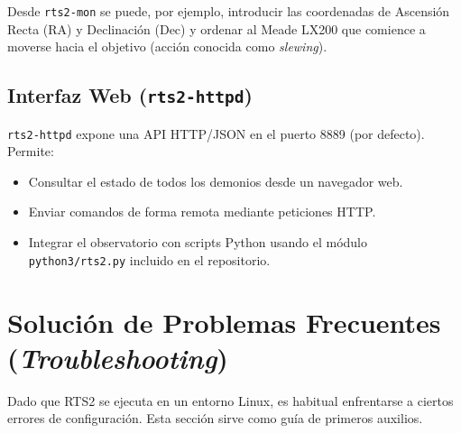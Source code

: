 \documentclass[12pt,a4paper,titlepage]{article}
\begin{document}
Desde \texttt{rts2-mon} se puede, por ejemplo, introducir las coordenadas de Ascensión Recta (RA) y Declinación (Dec) y ordenar al Meade LX200 que comience a moverse hacia el objetivo (acción conocida como \textit{slewing}).

\subsection{Interfaz Web (\texttt{rts2-httpd})}

\texttt{rts2-httpd} expone una API HTTP/JSON en el puerto 8889 (por defecto). Permite:
\begin{itemize}
  \item Consultar el estado de todos los demonios desde un navegador web.
  \item Enviar comandos de forma remota mediante peticiones HTTP.
  \item Integrar el observatorio con scripts Python usando el módulo \texttt{python3/rts2.py} incluido en el repositorio.
\end{itemize}

\section{Solución de Problemas Frecuentes (\textit{Troubleshooting})}

Dado que RTS2 se ejecuta en un entorno Linux, es habitual enfrentarse a ciertos errores de configuración. Esta sección sirve como guía de primeros auxilios.
\end{document}
